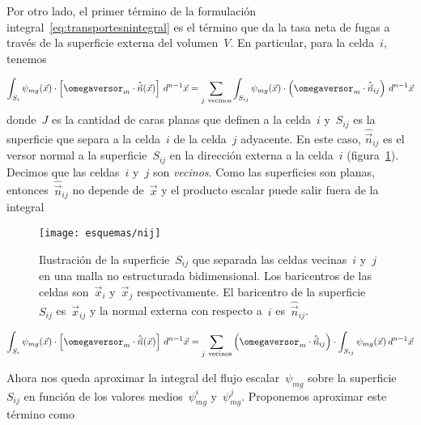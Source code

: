 Por otro lado, el primer término de la formulación integral~\eqref{eq:transportesnintegral} es el término que da la tasa neta de fugas a través de la superficie externa del volumen~$V$. En particular, para la celda~$i$, tenemos

\begin{equation*}
 \int_{S_i} \psi_{mg}(\vec{x}) \cdot \left[ \omegaversor_m \cdot \hat{\vec{n}}(\vec{x})\right]  \, d^{n-1}\vec{x}
= \sum_{j~\text{vecinos}} \int_{S_{ij}} \psi_{mg}(\vec{x}) \cdot \left( \omegaversor_m \cdot \hat{\vec{n}}_{ij}\right)  \, d^{n-1}\vec{x}
\end{equation*}
%
donde~$J$ es la cantidad de caras planas que definen a la celda~$i$ y~$S_{ij}$ es la superficie que separa a la celda~$i$ de la celda~$j$ adyacente. En este caso, $\hat{\vec{n}}_{ij}$ es el versor normal a la superficie~$S_{ij}$ en la dirección externa a la celda~$i$ (figura~\ref{fig:nij}). Decimos que las celdas~$i$ y~$j$ son \emph{vecinos}. Como las superficies son planas, entonces~$\hat{\vec{n}}_{ij}$ no depende de~$\vec{x}$ y el producto escalar puede salir fuera de la integral

\begin{figure}
 \begin{center}
  \texttt{[image: esquemas/nij]}
 \end{center}
\caption{\label{fig:nij}Ilustración de la superficie~$S_{ij}$ que separada las celdas vecinas~$i$ y~$j$ en una malla no estructurada bidimensional. Los baricentros de las celdas son~$\vec{x}_i$ y~$\vec{x}_j$ respectivamente. El baricentro de la superficie~$S_{ij}$ es~$\vec{x}_{ij}$ y la normal externa con respecto a~$i$ es~$\hat{\vec{n}}_{ij}$. }
\end{figure}


\begin{equation}\label{eq:snvol5}
 \int_{S_i} \psi_{mg}(\vec{x}) \cdot \left[ \omegaversor_m \cdot \hat{\vec{n}}(\vec{x})\right]  \, d^{n-1}\vec{x}
= \sum_{j~\text{vecinos}} \left( \omegaversor_m \cdot \hat{\vec{n}}_{ij}\right) \cdot \int_{S_{ij}} \psi_{mg}(\vec{x})  \, d^{n-1}\vec{x}
\end{equation}

Ahora nos queda aproximar la integral del flujo escalar~$\psi_{mg}$ sobre la superficie~$S_{ij}$ en función de los valores medios~$\psi_{mg}^i$ y~$\psi_{mg}^j$. Proponemos aproximar este término como

